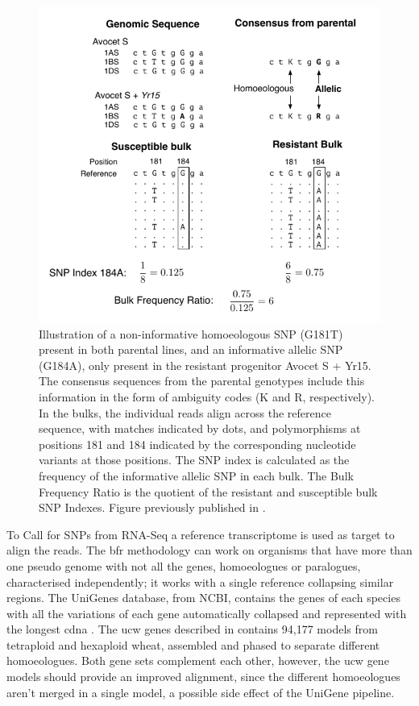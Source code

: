 \begin{figure}
\includegraphics[width=1\textwidth]{Yr15/Figures/bfr.pdf}
\caption{Illustration of a non-informative homoeologous SNP (G181T) present in both parental lines, and an informative allelic SNP (G184A), only present in the resistant progenitor Avocet S + Yr15. The consensus sequences from the parental genotypes include this information in the form of ambiguity codes (K and R, respectively). In the bulks, the individual reads align across the reference sequence, with matches indicated by dots, and polymorphisms at positions 181 and 184 indicated by the corresponding nucleotide variants at those positions. The SNP index is calculated as the frequency of the informative allelic SNP in each bulk. The Bulk Frequency Ratio is the quotient of the resistant and susceptible bulk SNP Indexes. Figure previously published in \citet{Ramirez-Gonzalez2015c}. }
\label{fig:yr15:bfr}
\end{figure}


To Call for SNPs from RNA-Seq a reference transcriptome is used as target to align the reads. 
The \gls{bfr} methodology can work on organisms that have more than one pseudo genome with not all the genes, homoeologues or paralogues, characterised independently; it works with a single reference collapsing similar regions. 
The UniGenes database, from NCBI, contains the genes of each species with all the variations of each gene automatically collapsed and represented with the longest \acrshort{cdna} \citep{PontiusJUWagnerL2002}. 
The \acrshort{ucw}  genes described in \citet{Krasileva2013} contains 94,177 models from tetraploid and hexaploid wheat, assembled and phased to separate different homoeologues. 
Both gene sets complement each other, however, the \acrshort{ucw} gene models should provide an improved alignment, since the different homoeologues aren't merged in a single model, a possible side effect of the UniGene pipeline. 


